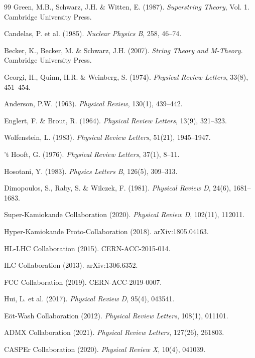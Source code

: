 \documentclass[12pt,a4paper]{book}
\theoremstyle{definition}
\theoremstyle{remark}
\begin{document}
\begin{thebibliography}{99}
 Green, M.B., Schwarz, J.H. \& Witten, E. (1987). \textit{Superstring Theory}, Vol. 1. Cambridge University Press.

 Candelas, P. et al. (1985). \textit{Nuclear Physics B}, 258, 46--74.

 Becker, K., Becker, M. \& Schwarz, J.H. (2007). \textit{String Theory and M-Theory}. Cambridge University Press.

 Georgi, H., Quinn, H.R. \& Weinberg, S. (1974). \textit{Physical Review Letters}, 33(8), 451--454.

 Anderson, P.W. (1963). \textit{Physical Review}, 130(1), 439--442.

 Englert, F. \& Brout, R. (1964). \textit{Physical Review Letters}, 13(9), 321--323.

 Wolfenstein, L. (1983). \textit{Physical Review Letters}, 51(21), 1945--1947.

 't Hooft, G. (1976). \textit{Physical Review Letters}, 37(1), 8--11.

 Hosotani, Y. (1983). \textit{Physics Letters B}, 126(5), 309--313.

 Dimopoulos, S., Raby, S. \& Wilczek, F. (1981). \textit{Physical Review D}, 24(6), 1681--1683.

 Super-Kamiokande Collaboration (2020). \textit{Physical Review D}, 102(11), 112011.

 Hyper-Kamiokande Proto-Collaboration (2018). arXiv:1805.04163.

 HL-LHC Collaboration (2015). CERN-ACC-2015-014.

 ILC Collaboration (2013). arXiv:1306.6352.

 FCC Collaboration (2019). CERN-ACC-2019-0007.

 Hui, L. et al. (2017). \textit{Physical Review D}, 95(4), 043541.

 E\"ot-Wash Collaboration (2012). \textit{Physical Review Letters}, 108(1), 011101.

 ADMX Collaboration (2021). \textit{Physical Review Letters}, 127(26), 261803.

 CASPEr Collaboration (2020). \textit{Physical Review X}, 10(4), 041039.


\end{thebibliography}
\end{document}
